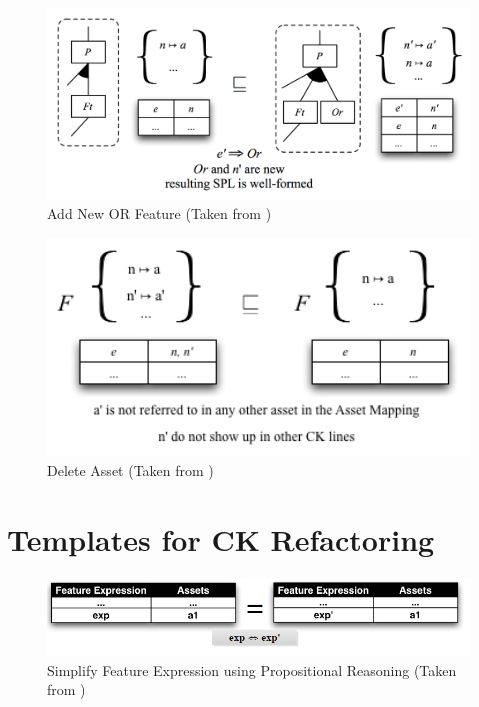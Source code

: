 \documentclass[12pt]{article}
\begin{document}
\begin{figure}[H]
\centering
\includegraphics[width=1\textwidth, frame]{images/TemplateAddNewOR}
\caption{Add New OR Feature (Taken from \cite{twiki})}
\end{figure}

\begin{figure}[H]
\centering
\includegraphics[width=1\textwidth, frame]{images/TemplatesDeleteAsset}
\caption{Delete Asset (Taken from \cite{twiki})}
\end{figure}

\pagebreak
\section{Templates for CK Refactoring}

\begin{figure}[H]
\centering
\includegraphics[width=1\textwidth, frame]{images/SimplifyFeatureExpression}
\caption{Simplify Feature Expression using Propositional Reasoning (Taken from \cite{msclmt})}
\end{figure}
\end{document}
